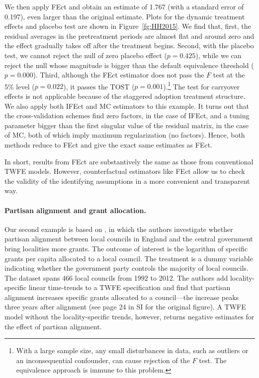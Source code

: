 \documentclass[12pt]{article}
\begin{document}
We then apply FEct and obtain an estimate of 1.767 (with a standard error of 0.197), even larger than the original estimate. Plots for the dynamic treatment effects and placebo test are shown in Figure~\ref{fg:HH2015}. We find that, first, the residual averages in the pretreatment periods are almost flat and around zero and the effect gradually takes off after the treatment begins. Second, with the placebo test, we cannot reject the null of zero placebo effect ($p = 0.425$), while we can reject the null whose magnitude is bigger than the default equivalence threshold ($p = 0.000$). Third, although the FEct estimator does not pass the $F$ test at the 5\% level ($p = 0.022$), it passes the TOST ($p = 0.001$).\footnote{With a large sample size, any small disturbances in data, such as outliers or an inconsequential confounder, can cause rejection of the $F$ test. The equivalence approach is immune to this problem.} The test for carryover effects is not applicable because of the staggered adoption treatment structure. We also apply both IFEct and MC estimators to this example. It turns out that the cross-validation schemes find zero factors, in the case of IFEct, and a tuning parameter bigger than the first singular value of the residual matrix, in the case of MC, both of which imply maximum regularization (no factors). Hence, both methods reduce to FEct and give the exact same estimates as FEct. 

In short, results from FEct are substantively the same as those from conventional TWFE models. However, counterfactual estimators like FEct allow us to check the validity of the identifying assumptions in a more convenient and transparent way. 

\paragraph{Partisan alignment and grant allocation.} Our second example is based on \citet{FM2015-yy}, in which the authors investigate whether partisan alignment between local councils in England and the central government bring localities more grants. The outcome of interest is the logarithm of specific grants per capita allocated to a local council. The treatment is a dummy variable indicating whether the government party controls the majority of local councils. The dataset spans 466 local councils from 1992 to 2012. The authors add locality-specific linear time-trends to a TWFE specification and find that partisan alignment increases specific grants allocated to a council---the increase peaks three years after alignment (see page 24 in SI for the original figure). A TWFE model without the locality-specific trends, however, returns negative estimates for the effect of partisan alignment.  
\end{document}
